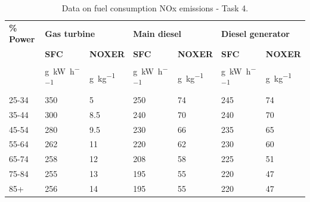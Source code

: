 \begin{table}[H]
    \centering
    \begin{tabular}{@{}lllllll@{}}
        \toprule
        \textbf{\% Power} & \multicolumn{2}{l}{\textbf{Gas turbine}} & \multicolumn{2}{l}{\textbf{Main diesel}} & \multicolumn{2}{l}{\textbf{Diesel generator}}                                                                                           \\
                          & \textbf{SFC}                             & \textbf{NOXER}                           & \textbf{SFC}                                  & \textbf{NOXER}           & \textbf{SFC}                      & \textbf{NOXER}           \\
                          & \si{\gram\per\kilo\watt\per\hour}        & \si{\gram\per\kilo\gram}                 & \si{\gram\per\kilo\watt\per\hour}             & \si{\gram\per\kilo\gram} & \si{\gram\per\kilo\watt\per\hour} & \si{\gram\per\kilo\gram} \\
        \midrule
        25-34             & 350                                      & 5                                        & 250                                           & 74                       & 245                               & 74                       \\
        35-44             & 300                                      & 8.5                                      & 240                                           & 70                       & 240                               & 70                       \\
        45-54             & 280                                      & 9.5                                      & 230                                           & 66                       & 235                               & 65                       \\
        55-64             & 262                                      & 11                                       & 220                                           & 62                       & 230                               & 60                       \\
        65-74             & 258                                      & 12                                       & 208                                           & 58                       & 225                               & 51                       \\
        75-84             & 255                                      & 13                                       & 195                                           & 55                       & 220                               & 47                       \\
        85+               & 256                                      & 14                                       & 195                                           & 55                       & 220                               & 47                       \\
        \bottomrule
    \end{tabular}
    \caption{Data on fuel consumption NOx emissions - Task 4.}
    \label{task4Table}
\end{table}
